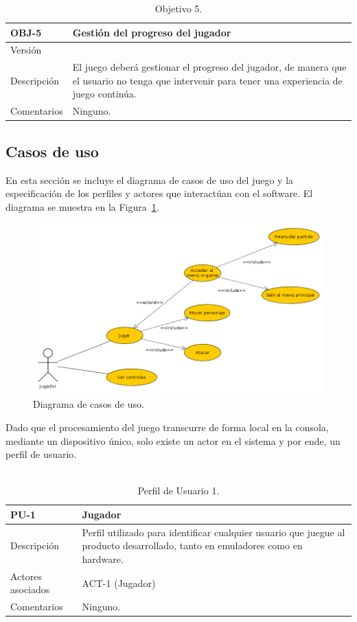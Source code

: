 \begin{table}[h]
	\centering
	\begin{tabular}{| l | p{12cm} |}
		\hline
		\textbf{OBJ-5} & \textbf{Gestión del progreso del jugador}  \\ \hline
		Versión & \gameversion{} \\ \hline
		Descripción & El juego deberá gestionar el progreso del jugador, de manera que el usuario no tenga que intervenir para tener una experiencia de juego continúa.  \\ \hline
		Comentarios & Ninguno. \\ \hline
	\end{tabular}
	\caption{Objetivo 5.}\label{tab:obj_5}
\end{table}
\FloatBarrier{}

\subsection{Casos de uso}
En esta sección se incluye el diagrama de casos de uso del juego y la especificación de los perfiles y actores que interactúan con el software. El diagrama se muestra en la Figura~\ref{fig:casos_uso}.

\begin{figure}[h]
	\centering
	\includegraphics[width=.7\textwidth]{capitulos/diagramas/casos_uso_2.png}
	\caption{Diagrama de casos de uso.}\label{fig:casos_uso}
\end{figure}
\FloatBarrier{}

Dado que el procesamiento del juego transcurre de forma local en la consola, mediante un dispositivo único, solo existe un actor en el sistema y por ende, un perfil de usuario. \\ \\

\begin{table}[h]
	\centering
	\begin{tabular}{| l | p{10cm} |}
		\hline
		\textbf{PU-1} & \textbf{Jugador}  \\ \hline
		Descripción & Perfil utilizado para identificar cualquier usuario que juegue al producto desarrollado, tanto en emuladores como en hardware.  \\ \hline
		Actores asociados & ACT-1 (Jugador) \\ \hline
		Comentarios & Ninguno.  \\ \hline
	\end{tabular}
	\caption{Perfil de Usuario 1.}\label{tab:pu-1}
\end{table}

